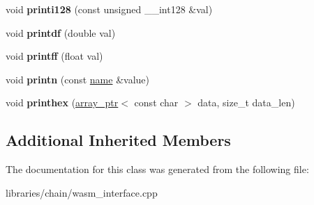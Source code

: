 \begin{DoxyCompactItemize}
void {\bfseries printi128} (const unsigned \+\_\+\+\_\+int128 \&val)
\item 
\mbox{\label{classaacio_1_1chain_1_1console__api_a902751f76c9e8542da7381656cf80ca1}} 
void {\bfseries printdf} (double val)
\item 
\mbox{\label{classaacio_1_1chain_1_1console__api_ab7258fb809ae2a5eb6f493d8a5b19599}} 
void {\bfseries printff} (float val)
\item 
\mbox{\label{classaacio_1_1chain_1_1console__api_a9817e3e7e4f51bb069864fb8a5cb19f5}} 
void {\bfseries printn} (const \mbox{\hyperlink{structaacio_1_1chain_1_1name}{name}} \&value)
\item 
\mbox{\label{classaacio_1_1chain_1_1console__api_a903b75b58c9ce0507bb8bf70c6f9604c}} 
void {\bfseries printhex} (\mbox{\hyperlink{structaacio_1_1chain_1_1array__ptr}{array\+\_\+ptr}}$<$ const char $>$ data, size\+\_\+t data\+\_\+len)
\end{DoxyCompactItemize}
\subsection*{Additional Inherited Members}


The documentation for this class was generated from the following file\+:\begin{DoxyCompactItemize}
\item 
libraries/chain/wasm\+\_\+interface.\+cpp\end{DoxyCompactItemize}
